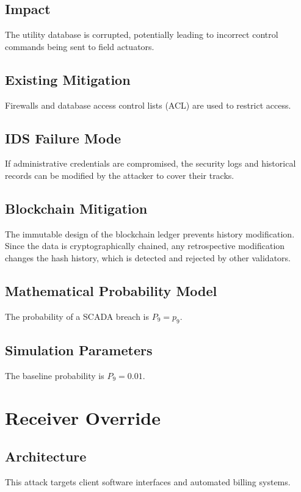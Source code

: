 \documentclass[12pt, oneside, a4paper]{report}
\theoremstyle{definition}
\theoremstyle{remark}
\begin{document}
\subsection{Impact}
The utility database is corrupted, potentially leading to incorrect control commands being sent to field actuators.

\subsection{Existing Mitigation}
Firewalls and database access control lists (ACL) are used to restrict access.

\subsection{IDS Failure Mode}
If administrative credentials are compromised, the security logs and historical records can be modified by the attacker to cover their tracks.

\subsection{Blockchain Mitigation}
The immutable design of the blockchain ledger prevents history modification. Since the data is cryptographically chained, any retrospective modification changes the hash history, which is detected and rejected by other validators.

\subsection{Mathematical Probability Model}
The probability of a SCADA breach is $P_9 = p_9$.

\subsection{Simulation Parameters}
The baseline probability is $P_9 = 0.01$.

\bigskip

\section{Receiver Override}
\label{sec:tm:receiver_override}

\subsection{Architecture}
This attack targets client software interfaces and automated billing systems.
\end{document}

